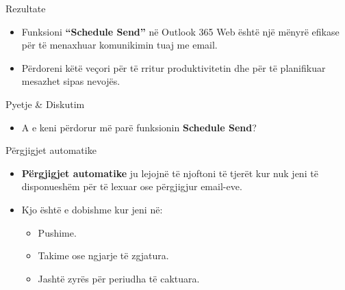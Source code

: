 \documentclass[
  ignorenonframetext,
]{beamer}
\providecommand{\tightlist}{%
  \setlength{\itemsep}{0pt}\setlength{\parskip}{0pt}}
\begin{document}
\begin{frame}{Rezultate}
\label{rezultate-3}
\begin{itemize}
\item
  Funksioni \textbf{``Schedule Send''} në Outlook 365 Web është një
  mënyrë efikase për të menaxhuar komunikimin tuaj me email.
\item
  Përdoreni këtë veçori për të rritur produktivitetin dhe për të
  planifikuar mesazhet sipas nevojës.
\end{itemize}
\end{frame}

\begin{frame}{Pyetje \& Diskutim}
\label{pyetje-diskutim-6}
\begin{itemize}
\tightlist
\item
  A e keni përdorur më parë funksionin \textbf{Schedule Send}?
\end{itemize}
\end{frame}

\begin{frame}{Përgjigjet automatike}
\label{puxebrgjigjet-automatike}
\begin{itemize}
\item
  \textbf{Përgjigjet automatike} ju lejojnë të njoftoni të tjerët kur
  nuk jeni të disponueshëm për të lexuar ose përgjigjur email-eve.
\item
  Kjo është e dobishme kur jeni në:

  \begin{itemize}
  \item
    Pushime.
  \item
    Takime ose ngjarje të zgjatura.
  \item
    Jashtë zyrës për periudha të caktuara.
  \end{itemize}
\end{itemize}
\end{frame}
\end{document}
